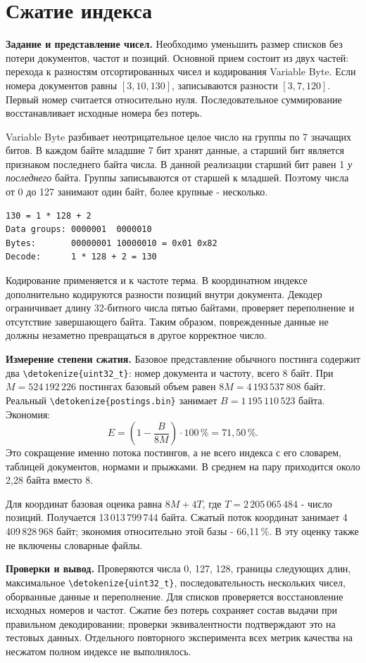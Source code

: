 \documentclass[pdf,unicode,12pt,a4paper,oneside,fleqn]{article}
\newcommand{\labsection}[2]{\par\Needspace{9\baselineskip}\setcounter{section}{\numexpr#1-1\relax}\section{#2}}
\newcommand{\partlabel}[1]{\par\Needspace{4\baselineskip}\medskip\textbf{#1.}\quad}
\DeclareRobustCommand{\code}[1]{\expandafter\nolinkurl\expandafter{\detokenize{#1}}}
\begin{document}
\labsection{11}{Сжатие индекса}

\partlabel{Задание и представление чисел}
Необходимо уменьшить размер списков без потери документов, частот и позиций.
Основной прием состоит из двух частей: перехода к разностям отсортированных
чисел и кодирования Variable Byte. Если номера документов равны
$[3,10,130]$, записываются разности $[3,7,120]$. Первый номер считается
относительно нуля. Последовательное суммирование восстанавливает исходные
номера без потерь.

Variable Byte разбивает неотрицательное целое число на группы по 7 значащих
битов. В каждом байте младшие 7 бит хранят данные, а старший бит является
признаком последнего байта числа. В данной реализации старший бит равен 1
\emph{у последнего} байта. Группы записываются от старшей к младшей.
Поэтому числа от 0 до 127 занимают один байт, более крупные - несколько.

\begin{lstlisting}
130 = 1 * 128 + 2
Data groups: 0000001  0000010
Bytes:       00000001 10000010 = 0x01 0x82
Decode:      1 * 128 + 2 = 130
\end{lstlisting}

Кодирование применяется и к частоте терма. В координатном индексе дополнительно
кодируются разности позиций внутри документа. Декодер ограничивает длину
32-битного числа пятью байтами, проверяет переполнение и отсутствие
завершающего байта. Таким образом, поврежденные данные не должны незаметно
превращаться в другое корректное число.

\partlabel{Измерение степени сжатия}
Базовое представление обычного постинга содержит два \code{uint32_t}:
номер документа и частоту, всего 8 байт. При $M=524\,192\,226$ постингах
базовый объем равен $8M=4\,193\,537\,808$ байт. Реальный
\code{postings.bin} занимает $B=1\,195\,110\,523$ байта. Экономия:
\[
 E=\left(1-\frac{B}{8M}\right)\cdot100\,\%=71{,}50\,\%.
\]
Это сокращение именно потока постингов, а не всего индекса с его словарем,
таблицей документов, нормами и прыжками. В среднем на пару приходится
около 2,28 байта вместо 8.

Для координат базовая оценка равна $8M+4T$, где $T=2\,205\,065\,484$ -
число позиций. Получается 13\,013\,799\,744 байта. Сжатый поток координат
занимает 4\,409\,828\,968 байт; экономия относительно этой базы -
66,11\,\%. В эту оценку также не включены словарные файлы.

\partlabel{Проверки и вывод}
Проверяются числа 0, 127, 128, границы следующих длин, максимальное
\code{uint32_t}, последовательность нескольких чисел, оборванные данные
и переполнение. Для списков проверяется восстановление исходных номеров
и частот. Сжатие без потерь сохраняет состав выдачи при правильном декодировании;
проверки эквивалентности подтверждают это на тестовых данных. Отдельного
повторного эксперимента всех метрик качества на несжатом полном индексе
не выполнялось.
\end{document}
